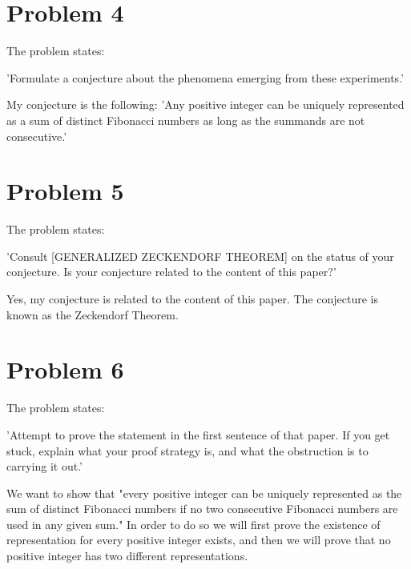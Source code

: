\documentclass[12pt]{article}
\begin{document}
\section{Problem 4}
The problem states:
\begin{center}
'Formulate a conjecture about the phenomena emerging from these experiments.'
\end{center}
My conjecture is the following: 'Any positive integer can be uniquely represented as a sum of distinct Fibonacci numbers as long as the summands are not consecutive.'

\section{Problem 5}
The problem states:
\begin{center}
'Consult [GENERALIZED ZECKENDORF THEOREM] on the status of your conjecture. Is your conjecture related to the content of this paper?'
\end{center}
Yes, my conjecture is related to the content of this paper. The conjecture is known as the Zeckendorf Theorem.

\section{Problem 6}
The problem states:
\begin{center}
'Attempt to prove the statement in the first sentence of that paper. If you get stuck, explain what your proof strategy is, and what the obstruction is to carrying it out.'
\end{center}
We want to show that "every positive integer can be uniquely represented as the sum of distinct Fibonacci numbers if no two consecutive Fibonacci numbers are used in any given sum." In order to do so we will first prove the existence of representation for every positive integer exists, and then we will prove that no positive integer has two different representations.
\end{document}
